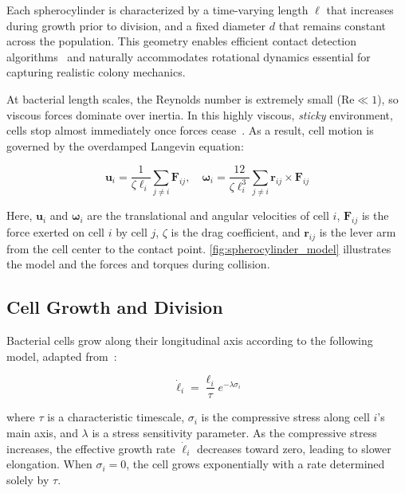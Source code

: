 \documentclass[conference]{IEEEtran}
\begin{document}
Each spherocylinder is characterized by a time-varying length $\ell$ that increases during growth prior to division, and a fixed diameter $d$ that remains constant across the population. This geometry enables efficient contact detection algorithms~\cite{GeometricTools} and naturally accommodates rotational dynamics essential for capturing realistic colony mechanics.

At bacterial length scales, the Reynolds number is extremely small ($\text{Re} \ll 1$), so viscous forces dominate over inertia. In this highly viscous, \textit{sticky} environment, cells stop almost immediately once forces cease~\cite{datta2024lifelowreynoldsnumber,Rudge2012}. As a result, cell motion is governed by the overdamped Langevin equation:

\begin{equation} \label{eq:overdamped_langevin}
    \mathbf{u}_i = \frac{1}{\zeta \ell_i} \sum_{j \neq i} \mathbf{F}_{ij}, \quad
    \boldsymbol{\omega}_i = \frac{12}{\zeta \ell_i^3} \sum_{j \neq i} \mathbf{r}_{ij} \times \mathbf{F}_{ij}
\end{equation}

Here, $\mathbf{u}_i$ and $\boldsymbol{\omega}_i$ are the translational and angular velocities of cell $i$, $\mathbf{F}_{ij}$ is the force exerted on cell $i$ by cell $j$, $\zeta$ is the drag coefficient, and $\mathbf{r}_{ij}$ is the lever arm from the cell center to the contact point. \autoref{fig:spherocylinder_model} illustrates the model and the forces and torques during collision.
\subsection{Cell Growth and Division}

Bacterial cells grow along their longitudinal axis according to the following model, adapted from~\cite{Weady2024SM}:

\begin{equation} \label{eq:growth}
    \dot{\ell}_i = \frac{\ell_i}{\tau} e^{-\lambda \sigma_i}
\end{equation}

where $\tau$ is a characteristic timescale, $\sigma_i$ is the compressive stress along cell $i$'s main axis, and $\lambda$ is a stress sensitivity parameter. As the compressive stress increases, the effective growth rate $\dot{\ell}_i$ decreases toward zero, leading to slower elongation. When $\sigma_i = 0$, the cell grows exponentially with a rate determined solely by $\tau$.
\end{document}
